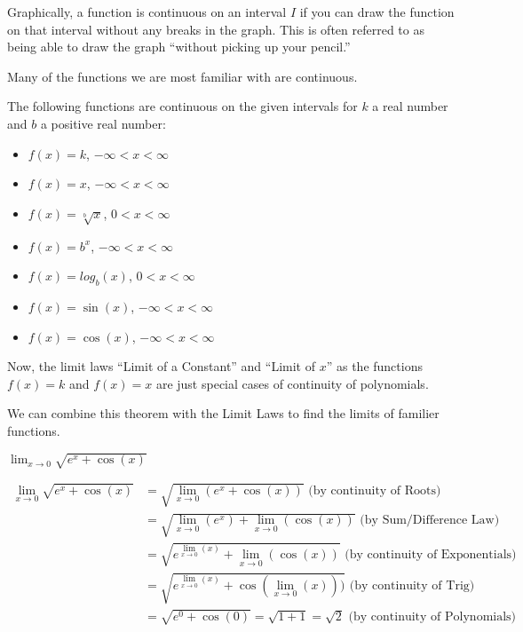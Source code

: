 \documentclass{ximera}
\begin{document}
Graphically, a function is continuous on an interval $I$ if you can
draw the function on that interval without any breaks in the graph.
This is often referred to as being able to draw the graph ``without
picking up your pencil.''

Many of the functions we are most familiar with are continuous.

\begin{theorem}\label{theorem:continuity}
The following functions are continuous on the given intervals for $k$ a real number and $b$ a positive real number:
\begin{itemize}
\item $f(x)=k$, $-\infty <x <\infty$
\item $f(x)=x$,  $-\infty <x <\infty$
\item $f(x)=\sqrt[b]{x}$, $0<x<\infty$
\item $f(x)=b^x$,  $-\infty <x <\infty$
\item $f(x)=log_b(x)$, $0<x<\infty$ 
\item $f(x)=\sin(x)$, $-\infty <x <\infty$
\item $f(x)=\cos(x)$, $-\infty <x <\infty$
\end{itemize}
\end{theorem}

Now, the limit laws ``Limit of a Constant'' and ``Limit of $x$'' as
the functions $f(x)=k$ and $f(x)=x$ are just special cases of
continuity of polynomials.

We can combine this theorem with the Limit Laws to find the limits of familier functions.
\begin{example}
$\lim_{x \to 0} \sqrt{e^{x}+\cos(x)}$
\begin{explanation}
\begin{align*}
  \lim_{x \to 0} \sqrt{e^{x}+\cos(x)} &= 
  \sqrt{\lim_{x \to 0} (e^{x}+\cos(x))} \text{\ \ (by continuity of Roots)}\\
  &= \sqrt{\lim_{x \to 0} (e^{x})+\lim_{x \to 0} (\cos(x))} \text{\ \ (by Sum/Difference Law)}\\
  &= \sqrt{e^{\lim_{x \to 0} (x)}+\lim_{x \to 0} (\cos(x))} \text{\ \ (by continuity of Exponentials)}\\
  &= \sqrt{e^{\lim_{x \to 0} (x)}+ \cos(\lim_{x \to 0}(x)))} \text{\ \ (by continuity of Trig)}\\
  &= \sqrt{e^{0}+ \cos(0)}=\sqrt{1+1}=\sqrt{2} \text{\ \ (by continuity of Polynomials)}
\end{align*}
\end{explanation}
\end{example}
\end{document}

